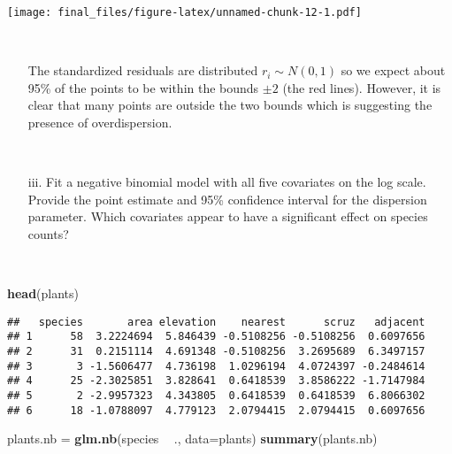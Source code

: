 \documentclass[]{article}
\newenvironment{Shaded}{\begin{snugshade}}{\end{snugshade}}
\newcommand{\KeywordTok}[1]{\textcolor[rgb]{0.13,0.29,0.53}{\textbf{#1}}}
\newcommand{\DataTypeTok}[1]{\textcolor[rgb]{0.13,0.29,0.53}{#1}}
\newcommand{\StringTok}[1]{\textcolor[rgb]{0.31,0.60,0.02}{#1}}
\newcommand{\OperatorTok}[1]{\textcolor[rgb]{0.81,0.36,0.00}{\textbf{#1}}}
\newcommand{\NormalTok}[1]{#1}
\begin{document}
\texttt{[image: final\_files/figure-latex/unnamed-chunk-12-1.pdf]}

~

\begin{itemize}   
\item[] The standardized residuals are distributed $r_i \sim N(0,1)$ so we expect about 95\% of the points to be within the bounds $\pm 2$ (the red lines). However, it is clear that many points are outside the two bounds which is suggesting the presence of overdispersion.
\end{itemize}

~

\begin{itemize} 
\item[iii.] Fit a negative binomial model with all five covariates on the log scale. Provide the point estimate and 95\% confidence interval for the dispersion parameter.  Which covariates appear to have a significant effect on species counts?
\end{itemize}

~

\begin{Shaded}
\begin{Highlighting}[]
\KeywordTok{head}\NormalTok{(plants)}
\end{Highlighting}
\end{Shaded}

\begin{verbatim}
##   species       area elevation    nearest      scruz   adjacent
## 1      58  3.2224694  5.846439 -0.5108256 -0.5108256  0.6097656
## 2      31  0.2151114  4.691348 -0.5108256  3.2695689  6.3497157
## 3       3 -1.5606477  4.736198  1.0296194  4.0724397 -0.2484614
## 4      25 -2.3025851  3.828641  0.6418539  3.8586222 -1.7147984
## 5       2 -2.9957323  4.343805  0.6418539  0.6418539  6.8066302
## 6      18 -1.0788097  4.779123  2.0794415  2.0794415  0.6097656
\end{verbatim}

\begin{Shaded}
\begin{Highlighting}[]
\NormalTok{plants.nb =}\StringTok{ }\KeywordTok{glm.nb}\NormalTok{(species }\OperatorTok{~}\StringTok{ }\NormalTok{., }\DataTypeTok{data=}\NormalTok{plants)}
\KeywordTok{summary}\NormalTok{(plants.nb)}
\end{Highlighting}
\end{Shaded}
\end{document}
